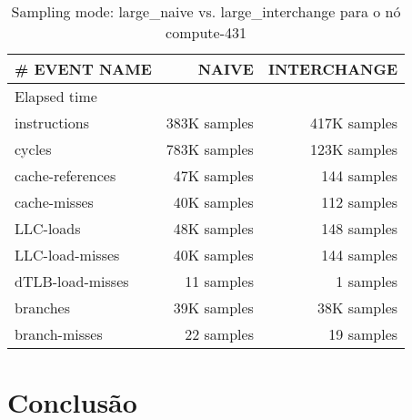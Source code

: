 \documentclass[conference,compsoc]{IEEEtran}
\begin{document}
 \begin{table}[H]
  \caption{Sampling mode: large\_naive vs. large\_interchange
 para o nó compute-431}
  \label{table:search_sampling}
  \centering
  \begin{tabular}{ | l | r | r |   }

  \hline
  \# EVENT NAME	 & NAIVE  & INTERCHANGE \\ \hline   
  Elapsed time & &  \\ \hline    
  instructions & 383K samples	& 417K samples  \\ \hline    
cycles	& 783K  samples &  123K samples  \\ \hline    
cache-references &	47K samples & 144 samples   \\ \hline    
cache-misses & 40K samples	& 112 samples \\ \hline    
LLC-loads	 &  48K samples &  148 samples \\ \hline    
LLC-load-misses	& 40K samples & 144 samples  \\ \hline    
dTLB-load-misses	& 11 samples & 1 samples \\ \hline    
branches	&  39K samples &  38K samples \\ \hline    
branch-misses	& 22 samples & 19 samples \\ \hline    
   \end{tabular}
  \end{table}



  \section{Conclusão}











\end{document}

